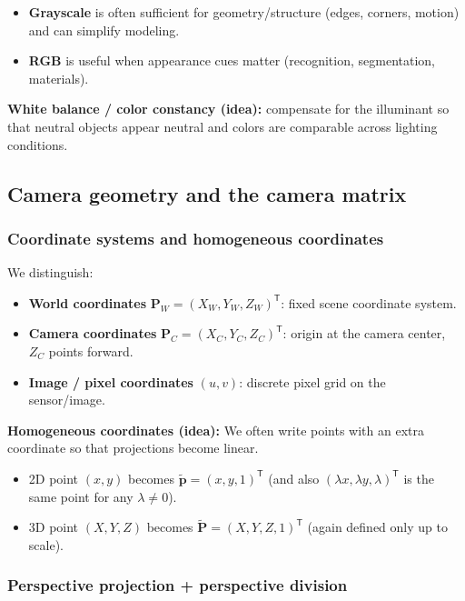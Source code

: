 \documentclass[11pt,a4paper]{article}
\newcommand{\vct}[1]{\bm{#1}}
\newcommand{\T}{^\mathsf{T}}
\begin{document}
\begin{itemize}
  \item \textbf{Grayscale} is often sufficient for geometry/structure (edges, corners, motion) and can simplify modeling.
  \item \textbf{RGB} is useful when appearance cues matter (recognition, segmentation, materials).
\end{itemize}

\begin{defbox}
\textbf{White balance / color constancy (idea):}
compensate for the illuminant so that neutral objects appear neutral and colors are comparable across lighting conditions.
\end{defbox}

\subsection{Camera geometry and the camera matrix}

\subsubsection{Coordinate systems and homogeneous coordinates}

We distinguish:
\begin{itemize}
  \item \textbf{World coordinates} $\vct{P}_W=(X_W,Y_W,Z_W)\T$: fixed scene coordinate system.
  \item \textbf{Camera coordinates} $\vct{P}_C=(X_C,Y_C,Z_C)\T$: origin at the camera center, $Z_C$ points forward.
  \item \textbf{Image / pixel coordinates} $(u,v)$: discrete pixel grid on the sensor/image.
\end{itemize}

\begin{defbox}
\textbf{Homogeneous coordinates (idea):}
We often write points with an extra coordinate so that projections become linear.
\begin{itemize}
  \item 2D point $(x,y)$ becomes $\tilde{\vct{p}}=(x,y,1)\T$ (and also $(\lambda x,\lambda y,\lambda)\T$ is the same point for any $\lambda\neq 0$).
  \item 3D point $(X,Y,Z)$ becomes $\tilde{\vct{P}}=(X,Y,Z,1)\T$ (again defined only up to scale).
\end{itemize}
\end{defbox}

\subsubsection{Perspective projection + perspective division}
\end{document}
